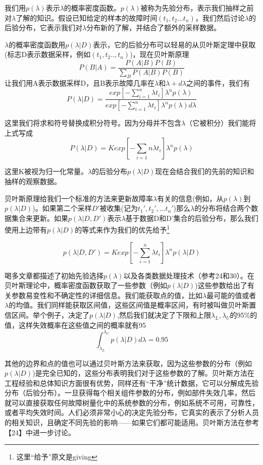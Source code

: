 \documentclass[cn,11pt,chinese]{elegantbook}
\begin{document}
{我们用$p(\lambda)$表示$\lambda$的概率密度函数。$p(\lambda)$被称为先验分布，表示我们抽样之前对$\lambda$了解的知识。假设已知给定的样本的故障时间$(t_1,t_2...t_n)$，我们然后讨论$\lambda$的后验分布，它表示我们对$\lambda$分布新的了解，并结合了额外的采样数据。

$\lambda$的概率密度函数用$p(\lambda | D)$表示，它的后验分布可以轻易的从贝叶斯定理中获取(标志D表示数据采样，例如$(t_1,t_2..,t_n)$)，现在贝叶斯原理
$$P(B|A)=\frac{P(A|B)P(B)}{\sum_B P(A | B)P(B)}$$
让我们用A表示数据采样D，且B表示故障几率在$\lambda$和$\lambda+d\lambda$之间的事件，我们有
$$P(\lambda | D )= \frac{exp[-\sum_{i=1}^{n} \lambda t_i]\lambda^n p(\lambda)}{exp[-\sum_{i=1}^{n} \lambda t_i] \lambda ^n p(\lambda)d \lambda}$$

这里我们将求和符号替换成积分符号。因为分母并不包含$\lambda$（它被积分）我们能将上式写成
$$P(\lambda | D)=K exp[-\sum_{i=1}{n}\lambda t_i]\lambda^n p(\lambda)$$

这里K被视为归一化常量。$\lambda$的后验分布$p(\lambda | D)$现在会结合我们的先前的知识和抽样的观察数据。

贝叶斯原理给我们一个标准的方法来更新故障率$\lambda$有关的信息(例如，从$p(\lambda)$到$p(\lambda | D)$)。如果第二个采样$D'$被收集(记为$t_1',t_2',...t_n'$)那么$\lambda$的分布将结合两个数据集合来更新。如果$p(\lambda | D,D')$表示$\lambda$基于数据D和D'集合的后验分布，那么我们使用上边带有$p(\lambda | D)$的等式来作为我们的优先给予\footnote{这里“给予”原文是giving}

$$p(\lambda | D,D')=K exp[-\sum_{i=1}^{n}\lambda t_i]\lambda^n p(\lambda | D)$$

喝多文章都描述了初始先验选择$p(\lambda)$以及各类数据处理技术（参考24和30）。在贝叶斯理论中，概率密度函数获取了一些参数（例如$p(\lambda | D)$)这些参数给出了有关参数易变性和不确定性的详细信息。我们能获取点的值，比如$\lambda$最可能的值或者$\lambda$的均值。我们同样能获取区间值，这些区间值是概率区间，有时被叫做贝叶斯置信区间。举个例子，决定了$p(\lambda | D)$,然后我们就决定了下限和上限$\lambda_L,\lambda_U$的95\%的值，这样失效概率在这些值之间的概率就有95%
$$\int_{\lambda_L}^{\lambda_U} p(\lambda | D)d\lambda = 0.95$$

其他的边界和点的值也可以通过贝叶斯方法来获取，因为这些参数的分布（例如$p(\lambda | D)$)是完全已知的，这些分布表明我们对于这些参数的了解。贝叶斯方法在工程经验和总体知识方面很有优势，同样还有“干净”统计数据，它可以分解成先验分布（后验分布）。一旦获得每个相关组件参数的分布，例如部件失效几率，然后就可以直接获取任何故障树量化中的系统参数的分布，例如系统不可用，可靠性，或者平均失效时间。人们必须非常小心的决定先验分布，它真实的表示了分析人员的相关知识，且确定不同先验的影响——如果它们都可能适用。贝叶斯方法在参考【24】中进一步讨论。

}
\end{document}
